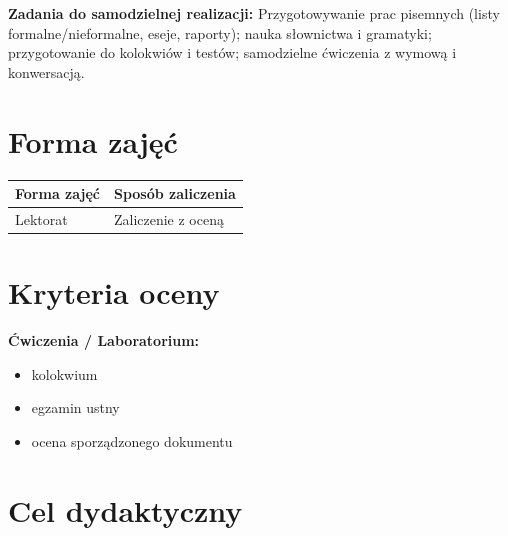 \documentclass[12pt, a4paper]{article}
\newcommand{\thdrule}{\noalign{\global\setlength{\extrarowheight}{0pt}}}
\newcommand{\thdend}{\noalign{\global\setlength{\extrarowheight}{3pt}}}
\begin{document}
\vspace{4pt}
\noindent\textbf{Zadania do samodzielnej realizacji:} Przygotowywanie prac pisemnych (listy formalne/nieformalne, eseje, raporty); nauka słownictwa i gramatyki; przygotowanie do kolokwiów i testów; samodzielne ćwiczenia z wymową i konwersacją.

\section{Forma zajęć}

\begin{center}
{\scriptsize
\begin{tabular}{m{5cm}m{8cm}}
\thdrule\toprule
\rowcolor{pjatkRed} {\color{white}\textbf{Forma zajęć}} & {\color{white}\textbf{Sposób zaliczenia}} \\
\midrule\thdend
  \rowcolor{tableRowLight} Lektorat & Zaliczenie z oceną \\
\bottomrule
\end{tabular}}
\end{center}

\section{Kryteria oceny}

\textbf{Ćwiczenia / Laboratorium:}
\begin{itemize}
  \item kolokwium
  \item egzamin ustny
  \item ocena sporządzonego dokumentu
\end{itemize}


\section{Cel dydaktyczny}
\end{document}
